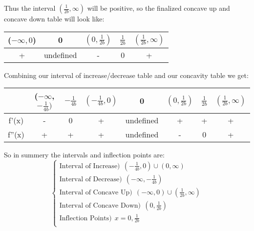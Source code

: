 \documentclass[11pt]{article}
\begin{document}
Thus the interval $(\frac{1}{2b},\infty)$ will be positive, so the finalized concave up and concave down table will look like:
\begin{center}
 \begin{tabular}{||c c c c c||} 
 \hline
 ($-\infty, 0$) & 0 & $(0, \frac{1}{2b})$ &  $\frac{1}{2b}$ & $( \frac{1}{2b},\infty)$  \\ [0.5ex] 
 \hline\hline
 + &  undefined & -  & 0 & +\\ 
 \hline
\end{tabular}
\end{center}
Combining our interval of increase/decrease table and our concavity table we get:
\begin{center}
 \begin{tabular}{|c |c c c c c c c||} 
 \hline
 &($-\infty$, $-\frac{1}{4b})$ & $-\frac{1}{4b}$ & $(-\frac{1}{4b}, 0)$ &  0 & $(0, \frac{1}{2b})$ &  $\frac{1}{2b}$ & $( \frac{1}{2b},\infty)$  \\ [0.5ex] 
 \hline\hline
 f'(x) &- & 0  & + & undefined & +  & + & +\\ 
 \hline
 f''(x) &+ &  + & + & undefined & - & 0 & +\\ 
\hline
\end{tabular}
\end{center}
So in summery the intervals and inflection points are:
$$
\begin{cases}
\text{Interval of Increase}) \ \  (-\frac{1}{4b}, 0) \cup (0,\infty) \\
\text{Interval of Decrease}) \ \ (-\infty, -\frac{1}{4b}) \\
\text{Interval of Concave Up}) \ \ (-\infty, 0) \cup ( \frac{1}{2b},\infty) \\
\text{Interval of Concave Down}) \ \ (0, \frac{1}{2b}) \\
\text{Inflection Points}) \ \ x = 0,   \frac{1}{2b} \\
\end{cases}
$$
\end{document}
